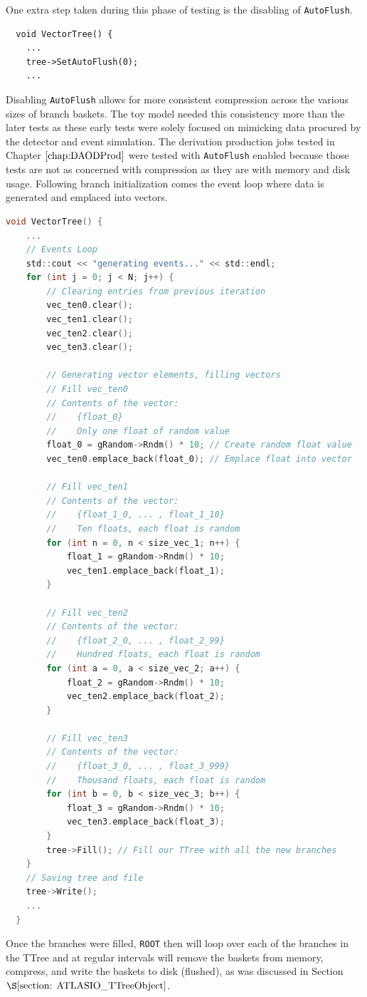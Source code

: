 One extra step taken during this phase of testing is the disabling of \verb|AutoFlush|. 
\begin{lstlisting}
  void VectorTree() {
    ...
    tree->SetAutoFlush(0);
    ...
\end{lstlisting}
Disabling \verb|AutoFlush| allows for more consistent compression across the various sizes of branch baskets. 
The toy model needed this consistency more than the later tests as these early tests were solely focused on mimicking data procured by the detector and event simulation. 
The derivation production jobs tested in Chapter $\ref{chap:DAODProd}$ were tested with \verb|AutoFlush| enabled because those tests are not as concerned with compression as they are with memory and disk usage.
Following branch initialization comes the event loop where data is generated and emplaced into vectors.

\begin{lstlisting}[language=C]  
  void VectorTree() {
    ...
    // Events Loop
    std::cout << "generating events..." << std::endl;
    for (int j = 0; j < N; j++) {
        // Clearing entries from previous iteration
        vec_ten0.clear();
        vec_ten1.clear();
        vec_ten2.clear();
        vec_ten3.clear();

        // Generating vector elements, filling vectors
        // Fill vec_ten0 
        // Contents of the vector:
        //    {float_0}
        //    Only one float of random value
        float_0 = gRandom->Rndm() * 10; // Create random float value
        vec_ten0.emplace_back(float_0); // Emplace float into vector
        
        // Fill vec_ten1
        // Contents of the vector:
        //    {float_1_0, ... , float_1_10}
        //    Ten floats, each float is random
        for (int n = 0, n < size_vec_1; n++) {
            float_1 = gRandom->Rndm() * 10;
            vec_ten1.emplace_back(float_1);
        }

        // Fill vec_ten2
        // Contents of the vector:
        //    {float_2_0, ... , float_2_99}
        //    Hundred floats, each float is random
        for (int a = 0, a < size_vec_2; a++) {
            float_2 = gRandom->Rndm() * 10;
            vec_ten2.emplace_back(float_2);
        }

        // Fill vec_ten3
        // Contents of the vector:
        //    {float_3_0, ... , float_3_999}
        //    Thousand floats, each float is random
        for (int b = 0, b < size_vec_3; b++) {
            float_3 = gRandom->Rndm() * 10;
            vec_ten3.emplace_back(float_3);
        }
        tree->Fill(); // Fill our TTree with all the new branches
    }
    // Saving tree and file
    tree->Write();
    ...
  }
\end{lstlisting}
Once the branches were filled, \verb|ROOT| then will loop over each of the branches in the TTree and at regular intervals will remove the baskets from memory, compress, and write the baskets to disk (flushed), as was discussed in Section $\S \ref{section: ATLASIO_TTreeObject}$.

